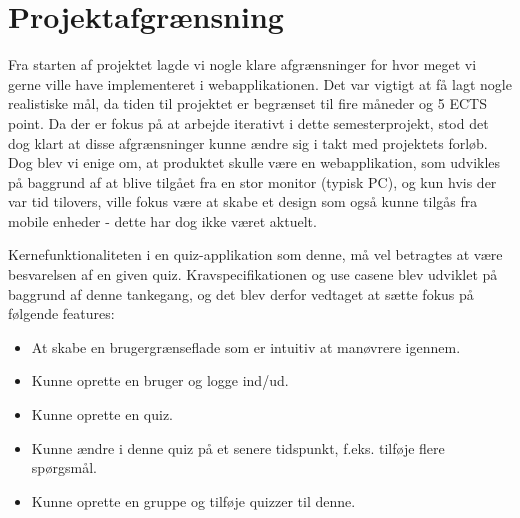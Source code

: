 \chapter{Projektafgrænsning}
Fra starten af projektet lagde vi nogle klare afgrænsninger for hvor meget vi gerne ville have implementeret i webapplikationen. Det var vigtigt at få lagt nogle realistiske mål, da tiden til projektet er begrænset til fire måneder og 5 ECTS point. Da der er fokus på at arbejde iterativt i dette semesterprojekt, stod det dog klart at disse afgrænsninger kunne ændre sig i takt med projektets forløb. Dog blev vi enige om, at produktet skulle være en webapplikation, som udvikles på baggrund af at blive tilgået fra en stor monitor (typisk PC), og kun hvis der var tid tilovers, ville fokus være at skabe et design som også kunne tilgås fra mobile enheder - dette har dog ikke været aktuelt.

Kernefunktionaliteten i en quiz-applikation som denne, må vel betragtes at være besvarelsen af en given quiz. Kravspecifikationen og use casene blev udviklet på baggrund af denne tankegang, og det blev derfor vedtaget at sætte fokus på følgende features:

\begin{itemize}
\item At skabe en brugergrænseflade som er intuitiv at manøvrere igennem.
\item Kunne oprette en bruger og logge ind/ud.
\item Kunne oprette en quiz.
\item Kunne ændre i denne quiz på et senere tidspunkt, f.eks. tilføje flere spørgsmål.
\item Kunne oprette en gruppe og tilføje quizzer til denne.
\end{itemize}

